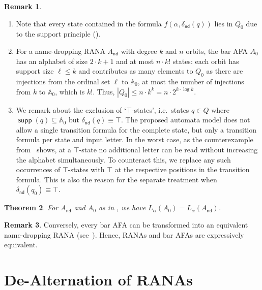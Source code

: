\documentclass[10pt,a4paper]{amsart}
\newtheorem{theo}{Theorem}[section]
\theoremstyle{definition}
\newtheorem{rem}[theo]{Remark}
\newcommand{\seq}{\subseteq}
\newcommand{\At}{\mathds{A}}
\newcommand{\op}[1]{\operatorname{\mathsf{#1}}}
\newcommand{\nd}{\op{nd}}
\DeclareMathOperator{\supp}{\mathsf{supp}}
\newcommand{\names}{\At}
\renewcommand{\enquote}[1]{`#1'}
\begin{document}
\begin{rem}\label{R:barafa}
  \begin{enumerate}%
  \item Note that every state contained in the formula $f(\alpha, \delta_{\nd}(q))$ lies in $Q_0$ due to the support principle (). 
  \item\label{R:barafa:2} For a name-dropping RANA $A_{\nd}$ with degree $k$ and $n$ orbits, the bar AFA $A_0$ has an alphabet of size $2\cdot k + 1$ and at most $n \cdot k!$ states: each orbit has support size $\ell \leqslant k$ and contributes as many elements to $Q_0$ as there are injections
      from the ordinal set $\ell$ to $\names_0$, at most the number of injections from $k$ to $\names_0$, which is $k!$. Thus, $|Q_0| \leqslant n \cdot k^k = n \cdot 2^{k \cdot \log k}$.  
    \item We remark about the exclusion of \enquote{$\top$-states}, i.e.~states $q \in Q$ where
      $\supp(q) \seq \names_0$ but $\delta_{\nd}(q) \equiv \top$. The proposed automata model does not allow
      a single transition formula for the complete state, but only a transition formula per state and
      input letter. In the worst case, as the counterexample from~ shows,
      at a $\top$-state no additional letter can be read without increasing the alphabet simultaneously.
      To counteract this, we replace any such occurrences of $\top$-states with $\top$
      at the respective positions in the transition formula. This is also the reason for the separate
      treatment when $\delta_{\nd}(q_0) \equiv \top$.
  \end{enumerate}
\end{rem}

\begin{theo} \label{thm:bafaEquiv}
For $A_{\nd}$ and $A_0$ as in , we have $L_\alpha(A_0) = L_\alpha(A_{\nd})$.
\end{theo}

\begin{rem}\label{rem:bafa2rana}
Conversely, every bar AFA can be transformed into an equivalent name-dropping RANA (see~). %
Hence, RANAs and bar AFAs are expressively equivalent.
\end{rem}

\section{De-Alternation of RANAs}\label{sec:dealt}
\end{document}
